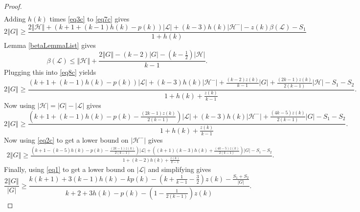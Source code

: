 \documentclass[10pt]{article}
\theoremstyle{plain}
\theoremstyle{definition}
\theoremstyle{remark}
\newcommand{\fancy}[1]{\mathcal{#1}}
\renewcommand{\L}{\fancy{L}}
\newcommand{\HH}{\fancy{H}}
\newcommand{\card}[1]{\left|#1\right|}
\newcommand{\size}[1]{\left\Vert#1\right\Vert}
\newcommand{\parens}[1]{\left( #1 \right)}
\begin{document}
\begin{proof}
\begin{align*}
\end{align*}
Adding $h(k)$ times \eqref{eq3c} to \eqref{eq7c} gives
\begin{equation}\label{eq8c}
2\size{G} \ge \frac{2\size{\HH} + \parens{k+1 +(k-1)h(k)- p(k)}\card{\L} + (k- 3)h(k)\card{\HH^-}  - z(k)\beta(\L) - S_1}{1 + h(k)}
\end{equation}
Lemma \ref{betaLemmaList} gives
\[\beta(\L) \le \size{\HH} + \frac{2\size{G} - (k-2)\card{G} - \parens{k - \frac12}\card{\HH}}{k-1}.\]
Plugging this into \eqref{eq8c} yields
\begin{equation}\label{eq9c}
2\size{G} \ge \frac{\parens{k+1 +(k-1)h(k)- p(k)}\card{\L} + (k- 3)h(k)\card{\HH^-} +\frac{(k-2)z(k)}{k-1}\card{G} + \frac{(2k-1)z(k)}{2(k-1)}\card{\HH} - S_1 - S_2}{1 + h(k) + \frac{z(k)}{k-1}}.
\end{equation}
Now using $\card{\HH} = \card{G} - \card{\L}$ gives
\begin{equation}\label{eq10c}
2\size{G} \ge \frac{\parens{k+1 +(k-1)h(k)- p(k) - \frac{(2k-1)z(k)}{2(k-1)}}\card{\L} + (k- 3)h(k)\card{\HH^-} +\frac{(4k-5)z(k)}{2(k-1)}\card{G} - S_1- S_2}{1 + h(k) + \frac{z(k)}{k-1}}.
\end{equation}
Now using \eqref{eq2c} to get a lower bound on $\card{\HH^-}$ gives
\begin{equation}\label{eq11c}
\begin{align*}
2\size{G} \ge \frac{\parens{k+1 - (k-5)h(k)- p(k) - \frac{(2k-1)z(k)}{2(k-1)}}\card{\L}+\parens{(k+1)(k-3)h(k) + \frac{(4k-5)z(k)}{2(k-1)}}\card{G} - S_1- S_2}{1 + (k-2)h(k) + \frac{z(k)}{k-1}}.
\end{align*}
\end{equation}
Finally, using \eqref{eq1} to get a lower bound on $\card{\L}$ and simplifying gives
\begin{equation}\label{eq12}
\frac{2\size{G}}{\card{G}} \ge \frac{k(k+1) + 3(k-1)h(k) - kp(k) - \parens{k + \frac{1}{k-1} - \frac32}z(k) - \frac{S_1 + S_2}{\card{G}}}{k+2 + 3h(k) - p(k) - \parens{1 - \frac{1}{2(k-1)}}z(k)}.
\end{equation}
\end{proof}
\end{document}
